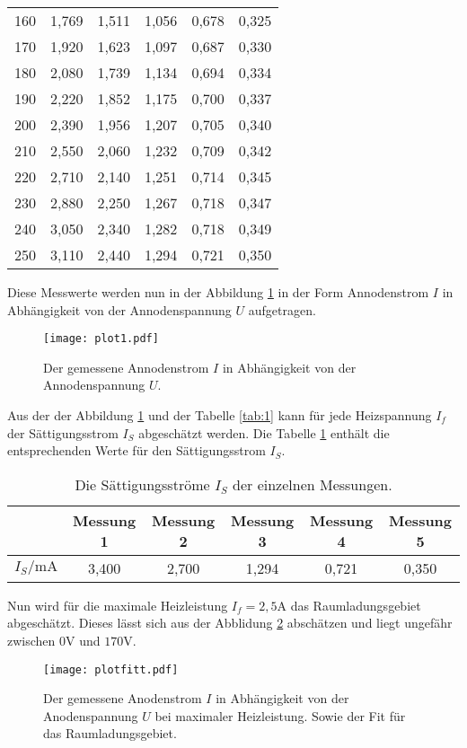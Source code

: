 \begin{table}
\begin{tabular}{c c c c c c}
  160 & 1,769 &  1,511 &  1,056 &  0,678 &  0,325\\
  170 & 1,920 &  1,623 &  1,097 &  0,687 &  0,330\\
  180 & 2,080 &  1,739 &  1,134 &  0,694 &  0,334\\
  190 & 2,220 &  1,852 &  1,175 &  0,700 &  0,337\\
  200 & 2,390 &  1,956 &  1,207 &  0,705 &  0,340\\
  210 & 2,550 &  2,060 &  1,232 &  0,709 &  0,342\\
  220 & 2,710 &  2,140 &  1,251 &  0,714 &  0,345\\
  230 & 2,880 &  2,250 &  1,267 &  0,718 &  0,347\\
  240 & 3,050 &  2,340 &  1,282 &  0,718 &  0,349\\
  250 & 3,110 &  2,440 &  1,294 &  0,721 &  0,350\\
  \bottomrule
 \end{tabular}
\end{table}

Diese Messwerte werden nun in der Abbildung \ref{fig:1} in der Form
Annodenstrom $I$ in Abhängigkeit von der Annodenspannung $U$
aufgetragen.

\begin{figure}
 \centering
 \texttt{[image: plot1.pdf]}
 \caption{Der gemessene Annodenstrom $I$ in
 Abhängigkeit von der Annodenspannung $U$.}
 \label{fig:1}
\end{figure}
\FloatBarrier

Aus der der Abbildung \ref{fig:1} und der Tabelle \ref{tab:1}
kann für jede Heizspannung $I_f$ der
Sättigungsstrom $I_S$ abgeschätzt werden.
Die Tabelle \ref{tab:I_s} enthält die entsprechenden Werte für den Sättigungsstrom $I_S$.
\begin{table}
  \centering
  \caption{Die Sättigungsströme $I_S$ der einzelnen Messungen.}
  \label{tab:I_s}
  \begin{tabular}{c c c c c c}
  \toprule
   &  Messung 1 & Messung 2 & Messung 3 & Messung 4 & Messung 5\\ %
   \midrule
  $I_S/\si{\milli\ampere}$ & 3,400 & 2,700  & 1,294 & 0,721 & 0,350\\
  \bottomrule
  \end{tabular}
\end{table}
\FloatBarrier

Nun wird für die maximale Heizleistung $I_f=2,5\si{\ampere}$
das Raumladungsgebiet abgeschätzt.
Dieses lässt sich aus der Abblidung \ref{fig:fitt} abschätzen
und liegt ungefähr zwischen $0\si{\volt}$ und $170\si{\volt}$.
\begin{figure}
 \centering
 \texttt{[image: plotfitt.pdf]}
 \caption{Der gemessene Anodenstrom $I$ in Abhängigkeit von der Anodenspannung $U$ bei maximaler
Heizleistung. Sowie der Fit für das Raumladungsgebiet.}
 \label{fig:fitt}
\end{figure}
\FloatBarrier

